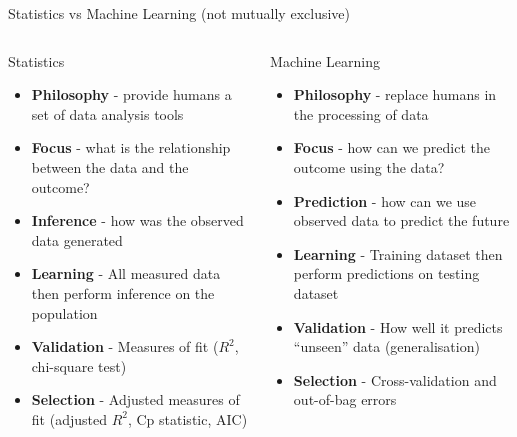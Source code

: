 \documentclass[pdf]{beamer}
\begin{document}
\begin{frame}{Statistics vs Machine Learning (not mutually exclusive)}
\footnotesize %
\begin{columns}
\begin{block}{Statistics}
	\begin{itemize}\addtolength{\itemsep}{0.6\baselineskip}
		\item<2-> \textbf{Philosophy} - provide humans a set of data analysis tools 
		\item<3-> \textbf{Focus} - what is the relationship between the data and the outcome? %
		\item<4-> \textbf{Inference} - how was the observed data generated
		\item<5-> \textbf{Learning} - All measured data then perform inference on the population
		\item<6-> \textbf{Validation} - Measures of fit ($R^2$, chi-square test)
		\item<7-> \textbf{Selection} - Adjusted measures of fit (adjusted $R^2$, Cp statistic, AIC)
	\end{itemize}
\end{block}
\begin{block}{Machine Learning}
	\begin{itemize}\addtolength{\itemsep}{0.6\baselineskip}
		\item<2-> \textbf{Philosophy} - replace humans in the processing of data  
		\item<3-> \textbf{Focus} - how can we predict the outcome using the data? %
		\item<4-> \textbf{Prediction} - how can we use observed data to predict the future
		\item<5-> \textbf{Learning} - Training dataset then perform predictions on testing dataset
		\item<6-> \textbf{Validation} - How well it predicts ``unseen'' data (generalisation)
		\item<7-> \textbf{Selection} - Cross-validation and out-of-bag errors
	\end{itemize}
\end{block}
\end{columns}
\end{frame}
\normalsize
\end{document}
